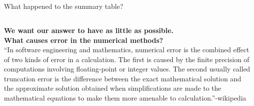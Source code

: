 \documentclass[fleqn]{beamer} %
\newcommand{\sectionIIIsubsectionIIItitle}{}
\newcommand{\sectionIIIsubsectionIVtitle}{}
\begin{document}
			\begin{frame}
				\frametitle{\sectionIIIsubsectionIIItitle}
				\bigskip

				What happened to the summary table?

				\btVFill
			\end{frame}


		\subsection{\sectionIIIsubsectionIVtitle}\label{sectionIIIsubsectionIV}

			\begin{frame}
				\frametitle{\sectionIIIsubsectionIVtitle}
				\bigskip

				\textbf{We want our answer to have as little \scalebox{1.5}{error} as possible.} \vspace{3mm}\\

				\textbf{What causes error in the numerical methods?} \\
				``In software engineering and mathematics, numerical error is the combined effect of two kinds of error in a calculation. The first is caused by the finite precision of computations involving floating-point or integer values. The second usually called truncation error is the difference between the exact mathematical solution and the approximate solution obtained when simplifications are made to the mathematical equations to make them more amenable to calculation.''-wikipedia\\

				\btVFill
			\end{frame}	
\end{document}
